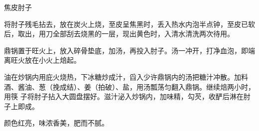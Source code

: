 \begin{recipe}{焦皮肘子}

\ingredients


\preparation

\step 将肘子残毛拈去，放在炭火上烧，至皮呈焦黑时，丢入热水内泡半点钟，至皮已软
后，取出，用刀全部刮去烧黑的一层，现出黄色时，入清水清洗两次待用。

\step 鼎锅置于旺火上，放入碎骨垫底，加汤，再投入肘子。汤一冲开，打净血泡，即端
离旺火放在小火上焙起。

\step 油在炒锅内用庇火烧热，下冰糖炒成汁，舀入少许鼎锅内的汤把糖汁冲散。加料
酒、酱油、葱（挽成结）、姜（拍破）、盐，用汤瓢荡匀翻入鼎锅。继续焙两小时，用筷
子将肘子拈入大圆盘摆好。滋汁泌入炒锅内，加味精，勾芡，收酽后淋在肘子上即成。

\features

颜色红亮，味浓香美，肥而不腻。

\end{recipe}

